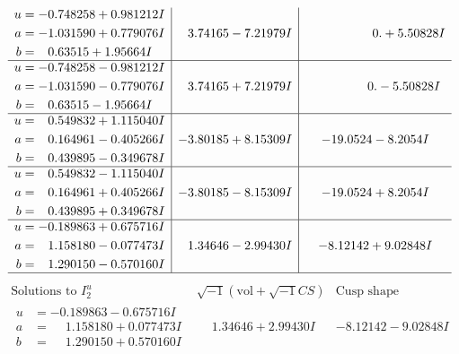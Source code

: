 \documentclass[1p]{elsarticle_modified}
\theoremstyle{definition}
\newcommand{\I}{\sqrt{-1}}
\begin{document}
$$\begin{array}{c|c|c}
\begin{aligned}
u &= -0.748258 + 0.981212 I \\
a &= -1.031590 + 0.779076 I \\
b &= \phantom{-}0.63515 + 1.95664 I\end{aligned}
 & \phantom{-}3.74165 - 7.21979 I & \phantom{-0.000000 -}0. + 5.50828 I \\ \hline\begin{aligned}
u &= -0.748258 - 0.981212 I \\
a &= -1.031590 - 0.779076 I \\
b &= \phantom{-}0.63515 - 1.95664 I\end{aligned}
 & \phantom{-}3.74165 + 7.21979 I & \phantom{-0.000000 } 0. - 5.50828 I \\ \hline\begin{aligned}
u &= \phantom{-}0.549832 + 1.115040 I \\
a &= \phantom{-}0.164961 - 0.405266 I \\
b &= \phantom{-}0.439895 - 0.349678 I\end{aligned}
 & -3.80185 + 8.15309 I & -19.0524 - 8.2054 I \\ \hline\begin{aligned}
u &= \phantom{-}0.549832 - 1.115040 I \\
a &= \phantom{-}0.164961 + 0.405266 I \\
b &= \phantom{-}0.439895 + 0.349678 I\end{aligned}
 & -3.80185 - 8.15309 I & -19.0524 + 8.2054 I \\ \hline\begin{aligned}
u &= -0.189863 + 0.675716 I \\
a &= \phantom{-}1.158180 - 0.077473 I \\
b &= \phantom{-}1.290150 - 0.570160 I\end{aligned}
 & \phantom{-}1.34646 - 2.99430 I & -8.12142 + 9.02848 I\\
 \hline 
 \end{array}$$\newpage$$\begin{array}{c|c|c}  
\text{Solutions to }I^u_{2}& \I (\text{vol} + \sqrt{-1}CS) & \text{Cusp shape}\\
 \hline 
\begin{aligned}
u &= -0.189863 - 0.675716 I \\
a &= \phantom{-}1.158180 + 0.077473 I \\
b &= \phantom{-}1.290150 + 0.570160 I\end{aligned}
 & \phantom{-}1.34646 + 2.99430 I & -8.12142 - 9.02848 I \\ \hline\begin{aligned}

\end{aligned}
\end{array}$$
\end{document}

